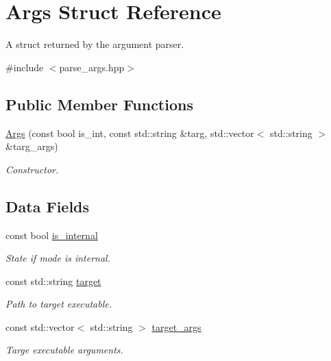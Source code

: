 \hypertarget{struct_args}{}\section{Args Struct Reference}
\label{struct_args}


A struct returned by the argument parser.  




{\ttfamily \#include $<$parse\+\_\+args.\+hpp$>$}

\subsection*{Public Member Functions}
\begin{DoxyCompactItemize}
\item 
\hyperlink{struct_args_a8ac9d30553b5fd1c8b6589cc9dd952ef}{Args} (const bool is\+\_\+int, const std\+::string \&targ, std\+::vector$<$ std\+::string $>$ \&targ\+\_\+args)
\begin{DoxyCompactList}\small\item\em Constructor. \end{DoxyCompactList}\end{DoxyCompactItemize}
\subsection*{Data Fields}
\begin{DoxyCompactItemize}
\item 
const bool \hyperlink{struct_args_a52d1f8c8297b000e30ff84b9ff1b9321}{is\+\_\+internal}
\begin{DoxyCompactList}\small\item\em State if mode is internal. \end{DoxyCompactList}\item 
const std\+::string \hyperlink{struct_args_a49f5255b7466ee4e1329aa32ca069da6}{target}
\begin{DoxyCompactList}\small\item\em Path to target executable. \end{DoxyCompactList}\item 
const std\+::vector$<$ std\+::string $>$ \hyperlink{struct_args_aa9f8e387df0b3691352daf352876176d}{target\+\_\+args}
\begin{DoxyCompactList}\small\item\em Targe executable arguments. \end{DoxyCompactList}\end{DoxyCompactItemize}



